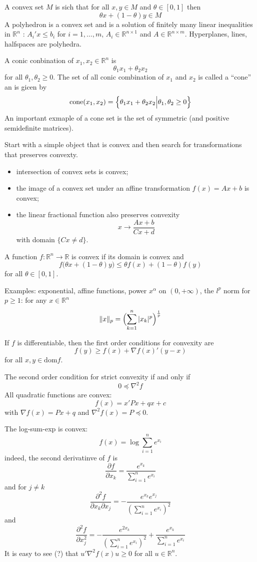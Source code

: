 \documentclass[a4paper]{article}
\newcommand{\Real}{\mathbb{R}}
\begin{document}
A convex set $M$ is sich that for all $x,y\in M$ and $\theta \in [0,1]$ then
\[ \theta x + (1 - \theta) y \in M \]
A polyhedron is a convex set and is a solution of finitely many linear inequalities
in $\Real^n$ : $A_i'x \leq b_i$ for $i=1,\ldots,m$, $A_i\in \Real^{n\times 1}$ and
$A\in \Real^{n\times m}$. Hyperplanes, lines, halfspaces are polyhedra.

A conic conbination of $x_1,x_2\in \Real^n$ is 
\[\theta_1 x_1 + \theta_2 x_2\]
for all $\theta_1,\theta_2 \geq 0$. The set of all conic combination of $x_1$
and $x_2$ is called a ``cone'' an is gicen by
\[ \text{cone}(x_1,x_2) = \Bigl\{ \theta_1 x_1 + \theta_2 x_2 \Bigr\rvert \Bigl. \theta_1,\theta_2\geq0 \Bigr\} \]
An important exmaple of a cone set is the set of symmetric (and positive semidefinite
matrices).

Start with a simple object that is convex and then search for transformations
that preserves convexty.
\begin{itemize}
	\item intersection of convex sets is convex;
	\item the image of a convex set under an affine transformation $f(x) = Ax + b$ is convex;
	\item the linear fractional function also preserves convexity
	\[x\to \frac{Ax + b}{Cx + d}\]
	with domain $\{Cx\neq d\}$.
\end{itemize}

A function $f:\Real^n \to\Real$ is convex if its domain is convex and 
\[f\bigl(\theta x+(1-\theta)y\bigr) \leq \theta f(x) + (1-\theta)f(y)\]
for all $\theta\in[0,1]$.

Examples: exponential, affine functions, power $x^\alpha$ on $(0,+\infty)$,
the $l^p$ norm for $p\geq 1$: for any $x\in \Real^n$
\[\|x\|_p = \Bigl(\sum_{k=1}^n |x_k|^p\Bigr)^\frac{1}{p}\]

If $f$ is differentiable, then the first order conditions for convexity are
\[f(y)\geq f(x) + \nabla f(x)'(y-x)\]
for all $x,y\in \text{dom} f$.

The second order condition for strict convexity if and only if
\[0 \preceq \nabla^2 f\]
All quadratic functions are convex:
\[ f(x) = x'Px + qx + c\]
with $\nabla f(x) = Px + q$ and $\nabla^2 f(x) = P\preceq 0$.

The log-sum-exp is convex:
\[f(x) = \log \sum_{i=1}^n e^{x_i}\]
indeed, the second derivatinve of $f$ is
\[ \frac{\partial f}{\partial x_k} = \frac{e^{x_k}}{\sum_{i=1}^n e^{x_i}} \]
and for $j\neq k$
\[ \frac{\partial^2 f}{\partial x_k\partial x_j} = -\frac{e^{x_k}e^{x_j}}{(\sum_{i=1}^n e^{x_i})^2} \]
and 
\[ \frac{\partial^2 f}{\partial x_j^2} = -\frac{e^{2x_k}}{(\sum_{i=1}^n e^{x_i})^2} + \frac{e^{x_k}}{\sum_{i=1}^n e^{x_i}} \]
It is easy to see (?) that $u'\nabla^2f(x) u \geq 0$ for all $u\in \Real^n$.
\end{document}
